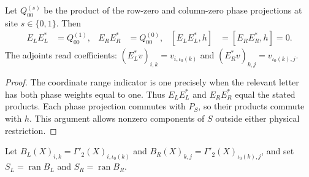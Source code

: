 \begin{theorem}
    \label{thm:mpo_joint_physical_crop_reduces}
    Let $Q_{00}^{(s)}$ be the product of the row-zero and column-zero
    phase projections at site $s\in\{0,1\}$. Then
    \begin{align}
        E_LE_L^* & =Q_{00}^{(1)}, & E_RE_R^*         & =Q_{00}^{(0)},
                 & [E_LE_L^*,h]   & =[E_RE_R^*,h]=0.
        \label{eq:mpo_joint_crop_reduces}
    \end{align}
    The adjoints read coefficients:
    $(E_L^*v)_{i,k}=v_{i,\iota_0(k)}$ and
    $(E_R^*v)_{k,j}=v_{\iota_0(k),j}$.
\end{theorem}
\begin{proof}
    The coordinate range indicator is one precisely when the relevant
    letter has both phase weights equal to one. Thus $E_LE_L^*$ and
    $E_RE_R^*$ equal the stated products. Each phase projection
    commutes with $P_S$, so their products commute with $h$.
    This argument allows nonzero components of $S$ outside either
    physical restriction.
\end{proof}

\begin{definition}
    \label{def:mpo_joint_cropped_support}
    Let $B_L(X)_{i,k}=\Gamma'_2(X)_{i,\iota_0(k)}$ and
    $B_R(X)_{k,j}=\Gamma'_2(X)_{\iota_0(k),j}$, and set
    $S_L=\operatorname{ran}B_L$ and $S_R=\operatorname{ran}B_R$.
\end{definition}

